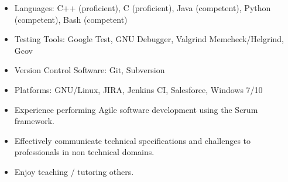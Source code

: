 \documentclass[10pt,letterpaper]{article}
\begin{document}
\begin{minipage}[t]{0.53\textwidth}
        \begin{flushleft}
                \begin{itemize}
                        \setlength\itemsep{-0.10em}
                        \item Languages: C++ (proficient), C (proficient), Java (competent), Python (competent), Bash (competent)
                        \item Testing Tools: Google Test, GNU Debugger, Valgrind Memcheck/Helgrind, Gcov
                        \item Version Control Software: Git, Subversion
                        \item Platforms: GNU/Linux, JIRA, Jenkins CI, Salesforce, Windows 7/10
                \end{itemize}
        \end{flushleft}
\end{minipage}
\begin{minipage}[t]{0.44\textwidth}
        \begin{flushright}
                \begin{flushleft}
                        \begin{itemize}
                                \setlength\itemsep{-0.10em}
                                \item Experience performing Agile software development using the Scrum framework.
                                \item Effectively communicate technical specifications
                                      and challenges to professionals in non technical domains.
                                \item Enjoy teaching / tutoring others.
                        \end{itemize}
                \end{flushleft}
        \end{flushright}
\end{minipage}
\end{document}

